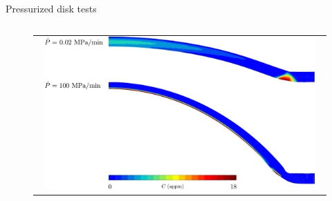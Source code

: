 \documentclass[9pt]{beamer}
\begin{document}
\begin{frame}{Pressurized disk tests}
\begin{columns}
        \begin{column}{0.5\textwidth}
            \begin{figure}
                \begin{tabular}{c}
                    \includegraphics[width=0.95\textwidth]{Images/C_P_rate.pdf}\\
                \end{tabular}
            \end{figure}
        \end{column}
    
    \end{columns}   
    
\end{frame}

\end{document}
